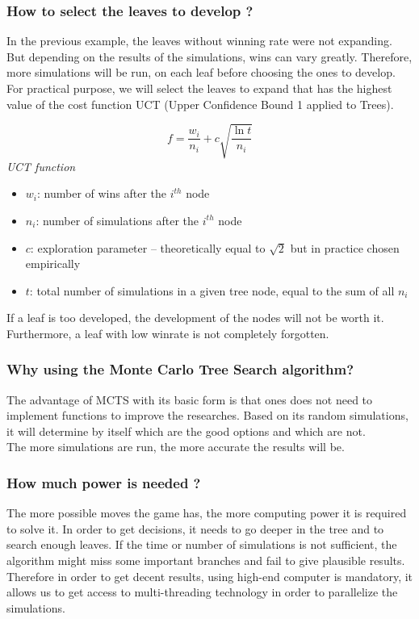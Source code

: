 \subsubsection{How to select the leaves to develop ?}
In the previous example, the leaves without winning rate were not expanding. But depending on the results of the simulations, wins can vary greatly. Therefore, more simulations will be run, on each leaf before choosing the ones to develop. For practical purpose, we will select the leaves to expand that has the highest value of the cost function UCT (Upper Confidence Bound 1 applied to Trees).\\
\bigskip
\begin{minipage}[b]{1\linewidth}
\centering
\begin{equation*}
f = \frac{w_i}{n_i} + c\sqrt{\frac{\ln t}{n_i}}
\end{equation*}
\medskip
\textit{UCT function}\cite{formula_UCT}

\end{minipage}%
\bigskip
\begin{itemize}
  \item \ensuremath{w_i}: number of wins after the \ensuremath{ i^{th}} node
  \item \ensuremath{n_i}: number of simulations after the \ensuremath{ i^{th}} node
  \item \ensuremath{c}: exploration parameter – theoretically equal to \ensuremath{\sqrt{2}} but in practice chosen empirically
  \item \ensuremath{t}: total number of simulations in a given tree node, equal to the sum of all \ensuremath{n_i}
\end{itemize}

If a leaf is too developed, the development of the nodes will not be worth it. Furthermore, a leaf with low winrate is not completely forgotten.\\

\subsubsection{Why using the Monte Carlo Tree Search algorithm?}
 The advantage of MCTS with its basic form is that ones does not need to implement functions to improve the researches. Based on its random simulations, it will determine by itself which are the good options and which are not.\\ The more simulations are run, the more accurate the results will be.

\subsubsection{How much power is needed ?}
The more possible moves the game has, the more computing power it is required to solve it. In order to get decisions, it needs to go deeper in the tree and to search enough leaves. If the time or number of simulations is not sufficient, the algorithm might miss some important branches and fail to give plausible results. Therefore in order to get decent results, using high-end computer is mandatory, it allows us to get access to multi-threading technology in order to parallelize the simulations.